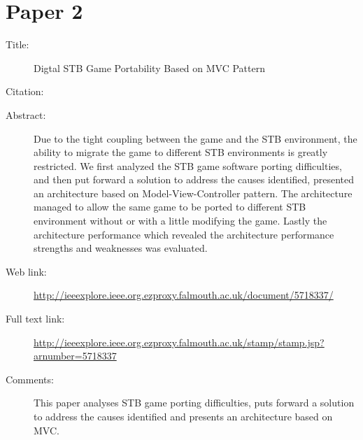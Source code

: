\documentclass{scrartcl}
\begin{document}
\section*{Paper 2}
\begin{description}
\item[Title:] Digtal STB Game Portability Based on MVC Pattern
\item[Citation:] \cite{STB}
\item[Abstract:] Due to the tight coupling between the game and the STB environment, the ability to migrate the game to different STB environments is greatly restricted. We first analyzed the STB game software porting difficulties, and then put forward a solution to address the causes identified, presented an architecture based on Model-View-Controller pattern. The architecture managed to allow the same game to be ported to different STB environment without or with a little modifying the game. Lastly the architecture performance which revealed the architecture performance strengths and weaknesses was evaluated.
\item[Web link:] \url{http://ieeexplore.ieee.org.ezproxy.falmouth.ac.uk/document/5718337/}
\item[Full text link:] \url{http://ieeexplore.ieee.org.ezproxy.falmouth.ac.uk/stamp/stamp.jsp?arnumber=5718337}
\item[Comments:] This paper analyses STB game porting difficulties, puts forward a solution to address the causes identified and presents an architecture based on MVC.
\end{description}
\end{document}
